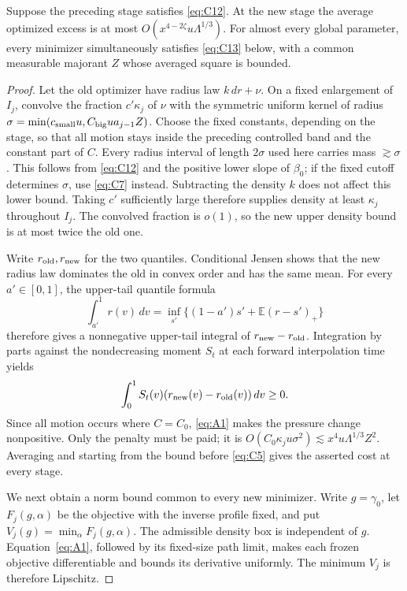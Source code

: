 \begin{lemma}\label{bud:envelope}
Suppose the preceding stage satisfies \eqref{eq:C12}.  At the new stage
the average optimized excess is at most
\(O(x^{4-2\zeta}u\Lambda^{1/3})\). For almost every global parameter,
every minimizer simultaneously satisfies \eqref{eq:C13} below,
with a common measurable majorant \(Z\) whose
averaged square is bounded.
\end{lemma}
\begin{proof}

Let the old optimizer have radius law \(k\,dr+\nu\). On a fixed
enlargement of \(I_j\), convolve the fraction \(c'\kappa_j\) of
\(\nu\) with the symmetric uniform kernel of radius
\(\sigma=\min(c_{\rm small}u,C_{\rm big}u a_{j-1}Z)\).
Choose the fixed constants, depending on the stage, so that all motion
stays inside the preceding controlled band and the constant part of
\(C\). Every radius interval of length \(2\sigma\) used here carries
mass \(\gtrsim\sigma\). This follows from \eqref{eq:C12} and the
positive lower slope of \(\beta_0\); if the fixed cutoff determines
\(\sigma\), use \eqref{eq:C7} instead. Subtracting the density \(k\)
does not affect this lower bound. Taking \(c'\) sufficiently large
therefore supplies density at least \(\kappa_j\) throughout \(I_j\).
The convolved fraction is \(o(1)\), so the new upper density bound is
at most twice the old one.

Write \(r_{\rm old},r_{\rm new}\) for the two quantiles. Conditional
Jensen shows that the new radius law dominates the old in convex order
and has the same mean. For every \(a'\in[0,1]\), the upper-tail
quantile formula
\[
 \int_{a'}^1r(v)\,dv
 =\inf_{s'}\{(1-a')s'+\mathbb E(r-s')_+\}
\]
therefore gives a nonnegative upper-tail integral of
\(r_{\rm new}-r_{\rm old}\). Integration by parts against the
nondecreasing moment \(S_t\) at each forward interpolation time yields
\[
 \int_0^1 S_t(v)(r_{\rm new}(v)-r_{\rm old}(v))\,dv\ge0.
\]
Since all motion occurs where \(C=C_0\), \eqref{eq:A1} makes the
pressure change nonpositive. Only the penalty must be paid; it is
\(O(C_0\kappa_ju\sigma^2)\lesssim x^4u\Lambda^{1/3}Z^2\).
Averaging and starting from the bound before \eqref{eq:C5} gives the
asserted cost at every stage.

We next obtain a norm bound common to every new minimizer. Write
\(g=\gamma_0\), let \(F_j(g,\alpha)\) be the objective with the
inverse profile fixed, and put \(V_j(g)=\min_\alpha F_j(g,\alpha)\).
The admissible density box is independent of \(g\).
Equation~\eqref{eq:A1}, followed by its fixed-size path limit, makes
each frozen objective differentiable and bounds its derivative uniformly.
The minimum \(V_j\) is therefore Lipschitz.


\end{proof}

